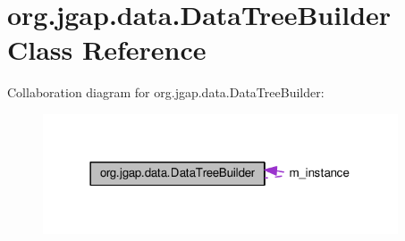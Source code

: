\hypertarget{classorg_1_1jgap_1_1data_1_1_data_tree_builder}{\section{org.\-jgap.\-data.\-Data\-Tree\-Builder Class Reference}
\label{classorg_1_1jgap_1_1data_1_1_data_tree_builder}
}


Collaboration diagram for org.\-jgap.\-data.\-Data\-Tree\-Builder\-:
\nopagebreak
\begin{figure}[H]
\begin{center}
\leavevmode
\includegraphics[width=298pt]{classorg_1_1jgap_1_1data_1_1_data_tree_builder__coll__graph}
\end{center}
\end{figure}
